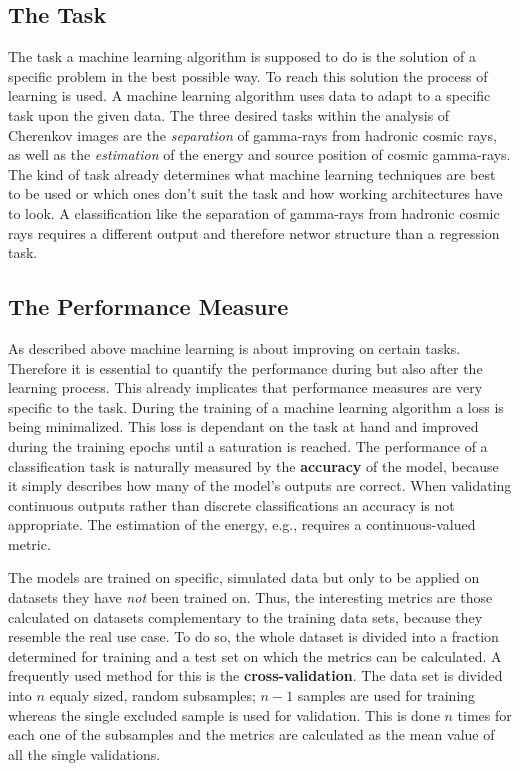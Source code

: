 \subsection{The Task}
%
The task a machine learning algorithm is supposed to do is the solution of a
specific problem in the best possible way. To reach this solution the process
of learning is used. A machine learning algorithm uses data to adapt to a specific task upon the given data. The three desired tasks
within the analysis of Cherenkov images are the \textit{separation} of
gamma-rays from hadronic cosmic rays, as well as the \textit{estimation} of the
energy and source position of cosmic gamma-rays. The kind of task already
determines what machine learning techniques are best to be used or which ones
don't suit the task and how working architectures have to look. A
classification like the separation of gamma-rays from hadronic cosmic rays
requires a different output and therefore networ structure than a regression
task.

\subsection{The Performance Measure}
%
As described above machine learning is about improving on certain tasks.
Therefore it is essential to quantify the performance during but also after the
learning process. This already implicates that performance measures are very
specific to the task. During the training of a machine learning algorithm a
loss is being minimalized. This loss is dependant on the task at hand and improved during the training epochs until a saturation is reached. The performance of a classification task is naturally
measured by the \textbf{accuracy} of the model, because it simply describes how
many of the model's outputs are correct. When validating continuous outputs
rather than discrete classifications an accuracy is not appropriate. The
estimation of the energy, e.g., requires a continuous-valued metric.

The models are trained on specific, simulated data but only to be applied on
datasets they have \textit{not} been trained on. Thus, the interesting metrics
are those calculated on datasets complementary to the training data sets,
because they resemble the real use case. To do so, the whole dataset is divided
into a fraction determined for training and a test set on which the metrics can
be calculated. A frequently used method for this is the
\textbf{cross-validation}. The data set is divided into $n$ equaly sized, random
subsamples; $n-1$ samples are used for training whereas the single excluded
sample is used for validation. This is done $n$ times for each one of the
subsamples and the metrics are calculated as the mean value of all the single
validations.

